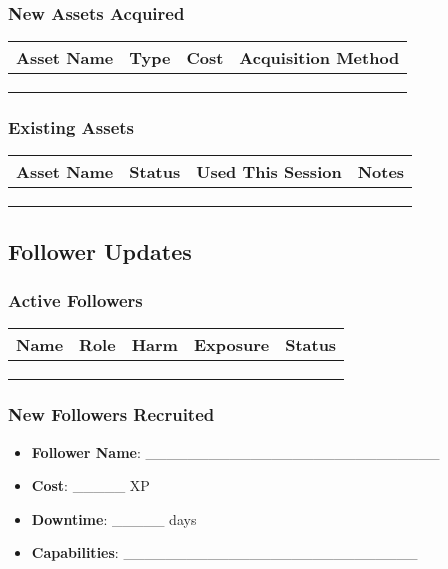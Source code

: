 \documentclass[11pt,letterpaper]{article}
\begin{document}
\subsubsection{New Assets Acquired}
\begin{tabularx}{\textwidth}{|l|l|l|X|}
\hline
\textbf{Asset Name} & \textbf{Type} & \textbf{Cost} & \textbf{Acquisition Method} \\
\hline
& & & \\
& & & \\
& & & \\
\hline
\end{tabularx}

\subsubsection{Existing Assets}
\begin{tabularx}{\textwidth}{|l|l|l|l|}
\hline
\textbf{Asset Name} & \textbf{Status} & \textbf{Used This Session} & \textbf{Notes} \\
\hline
& & & \\
& & & \\
& & & \\
\hline
\end{tabularx}

\subsection{Follower Updates}

\subsubsection{Active Followers}
\begin{tabularx}{\textwidth}{|l|l|c|c|X|}
\hline
\textbf{Name} & \textbf{Role} & \textbf{Harm} & \textbf{Exposure} & \textbf{Status} \\
\hline
& & & & \\
& & & & \\
& & & & \\
\hline
\end{tabularx}

\subsubsection{New Followers Recruited}
\begin{itemize}
    \item \textbf{Follower Name}: \_\_\_\_\_\_\_\_\_\_\_\_\_\_\_\_\_\_\_\_\_\_\_\_\_\_\_\_
    \item \textbf{Cost}: \_\_\_\_\_ XP
    \item \textbf{Downtime}: \_\_\_\_\_ days
    \item \textbf{Capabilities}: \_\_\_\_\_\_\_\_\_\_\_\_\_\_\_\_\_\_\_\_\_\_\_\_\_\_\_\_
\end{itemize}
\end{document}
